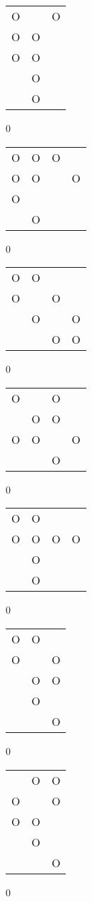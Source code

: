 \begin{tabular}{|m{0.2cm}m{0.2cm}m{0.2cm}|}\hline
O& &O\\
O&O& \\
O&O& \\
 &O& \\
 &O& \\
\hline\end{tabular}0
\begin{tabular}{|m{0.2cm}m{0.2cm}m{0.2cm}m{0.2cm}|}\hline
O&O&O& \\
O&O& &O\\
O& & & \\
 &O& & \\
\hline\end{tabular}0
\begin{tabular}{|m{0.2cm}m{0.2cm}m{0.2cm}m{0.2cm}|}\hline
O&O& & \\
O& &O& \\
 &O& &O\\
 & &O&O\\
\hline\end{tabular}0
\begin{tabular}{|m{0.2cm}m{0.2cm}m{0.2cm}m{0.2cm}|}\hline
O& &O& \\
 &O&O& \\
O&O& &O\\
 & &O& \\
\hline\end{tabular}0
\begin{tabular}{|m{0.2cm}m{0.2cm}m{0.2cm}m{0.2cm}|}\hline
O&O& & \\
O&O&O&O\\
 &O& & \\
 &O& & \\
\hline\end{tabular}0
\begin{tabular}{|m{0.2cm}m{0.2cm}m{0.2cm}|}\hline
O&O& \\
O& &O\\
 &O&O\\
 &O& \\
 & &O\\
\hline\end{tabular}0
\begin{tabular}{|m{0.2cm}m{0.2cm}m{0.2cm}|}\hline
 &O&O\\
O& &O\\
O&O& \\
 &O& \\
 & &O\\
\hline\end{tabular}0
